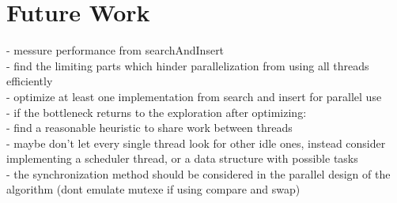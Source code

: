 \chapter{Future Work}
- messure performance from searchAndInsert\\
- find the limiting parts which hinder parallelization from using all threads efficiently\\
- optimize at least one implementation from search and insert for parallel use\\
- if the bottleneck returns to the exploration after optimizing:\\
- find a reasonable heuristic to share work between threads\\
- maybe don't let every single thread look for other idle ones, instead consider implementing a scheduler thread, or a data structure with possible tasks\\

- the synchronization method should be considered in the parallel design of the algorithm (dont emulate mutexe if using compare and swap)